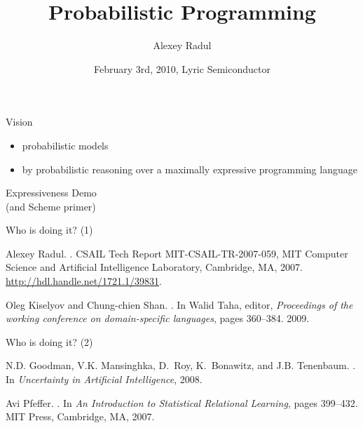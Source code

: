 \documentclass{beamer}
\title[Probabilistic Programming]{Probabilistic Programming}
\author{Alexey Radul}
\date{February 3rd, 2010, Lyric Semiconductor}
\newcommand{\wordslide}[1]{\begin{frame}\begin{center}\Huge {#1}\end{center}\end{frame}}
\newcommand{\stress}[1]{{\color{red}{{#1}}}}
\begin{document}
\begin{frame}
\maketitle
\end{frame}

\begin{frame}
\begin{center}\Huge Vision\end{center}
\begin{itemize}\Large
\item \stress{Maximally expressive} probabilistic models
\pause
\item by probabilistic reasoning over a maximally expressive programming language
\end{itemize}
\end{frame}

\wordslide{Expressiveness Demo\\ \small (and Scheme primer)}

\begin{frame}
\begin{center}\Huge Who is doing it? (1)\end{center}
\begin{thebibliography}{1}
Alexey Radul.
.
\newblock CSAIL Tech Report MIT-CSAIL-TR-2007-059, MIT Computer Science and
  Artificial Intelligence Laboratory, Cambridge, MA, 2007.
  \url{http://hdl.handle.net/1721.1/39831}.

Oleg Kiselyov and Chung-chien Shan.
.
\newblock In Walid Taha, editor, {\em Proceedings of the working conference on
  domain-specific languages}, pages 360--384. 2009.

\end{thebibliography}
\end{frame}

\begin{frame}
\begin{center}\Huge Who is doing it? (2)\end{center}
\begin{thebibliography}{1}
N.D. Goodman, V.K. Mansinghka, D.~Roy, K.~Bonawitz, and J.B. Tenenbaum.
.
\newblock In {\em Uncertainty in Artificial Intelligence}, 2008.

Avi Pfeffer.
.
\newblock In {\em An Introduction to Statistical Relational Learning}, pages
  399--432. MIT Press, Cambridge, MA, 2007.

\end{thebibliography}
\end{frame}
\end{document}
